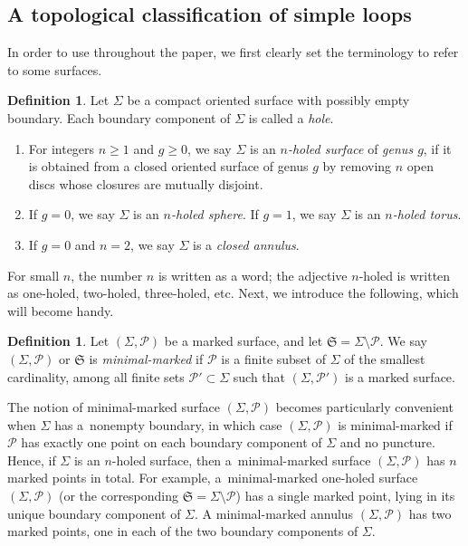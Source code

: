 \documentclass[pdftex]{sigma}
\numberwithin{equation}{section}
\theoremstyle{definition}
\newtheorem{Definition}[Theorem]{Definition}
\begin{document}
\subsection{A topological classification of simple loops}
\label{subsec:topological_classification_of_simple_loops}
In order to use throughout the paper, we first clearly set the terminology to refer to some surfaces.
\begin{Definition}
\label{def:surface_terminology}
Let $\Sigma$ be a compact oriented surface with possibly empty boundary. Each boundary component of $\Sigma$ is called a {\em hole}.
\begin{enumerate}[label={\rm (\arabic*)}]\itemsep=0pt
\item For integers $n\ge 1$ and $g\ge 0$, we say $\Sigma$ is an {\em $n$-holed surface} of {\em genus $g$}, if it is obtained from a closed oriented surface of genus $g$ by removing $n$ open discs whose closures are mutually disjoint.
\item If $g=0$, we say $\Sigma$ is an {\em $n$-holed sphere}. If $g=1$, we say $\Sigma$ is an {\em $n$-holed torus}.
\item If $g=0$ and $n=2$, we say $\Sigma$ is a {\em closed annulus}.
\end{enumerate}
\end{Definition}
For small $n$, the number $n$ is written as a word; the adjective $n$-holed is written as one-holed, two-holed, three-holed, etc. Next, we introduce the following, which will become handy.
\begin{Definition}
\label{def:minimal-marked}
Let $(\Sigma,\mathcal{P})$ be a marked surface, and let $\mathfrak{S} = \Sigma\setminus\mathcal{P}$. We say $(\Sigma,\mathcal{P})$ or $\mathfrak{S}$ is {\em minimal-marked} if $\mathcal{P}$ is a finite subset of $\Sigma$ of the smallest cardinality, among all finite sets $\mathcal{P}' \subset \Sigma$ such that $(\Sigma,\mathcal{P}')$ is a marked surface.
\end{Definition}
The notion of minimal-marked surface $(\Sigma,\mathcal{P})$ becomes particularly convenient when $\Sigma$ has a~nonempty boundary, in which case $(\Sigma,\mathcal{P})$ is minimal-marked if $\mathcal{P}$ has exactly one point on each boundary component of $\Sigma$ and no puncture. Hence, if $\Sigma$ is an $n$-holed surface, then a~minimal-marked surface $(\Sigma,\mathcal{P})$ has $n$ marked points in total. For example, a~minimal-marked one-holed surface $(\Sigma,\mathcal{P})$ (or the corresponding $\mathfrak{S} = \Sigma\setminus\mathcal{P}$) has a single marked point, lying in its unique boundary component of $\Sigma$. A minimal-marked annulus $(\Sigma, \mathcal{P})$ has two marked points, one in each of the two boundary components of $\Sigma$.
\end{document}

